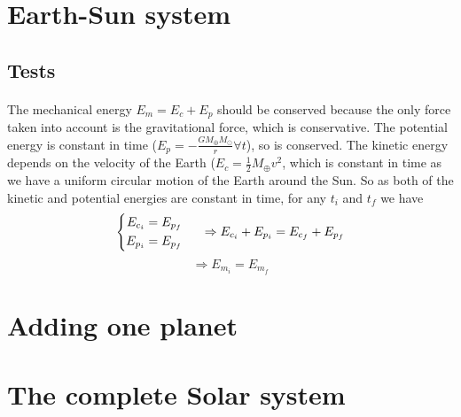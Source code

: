 \documentclass[a4paper, twoside, 11pt]{report}
\theoremstyle{theorem}
\theoremstyle{remark}
\theoremstyle{exemple}
\begin{document}
    \section{Earth-Sun system}
        \subsection{}
        
        \subsection{Tests}
            \paragraph{}The mechanical energy $E_m = E_c + E_p$ should be conserved because the only force taken into account is the gravitational force, which is conservative. The potential energy is constant in time ($E_p = -\frac{GM_{\oplus}M_{\odot}}{r} \forall t$), so is conserved. The kinetic energy depends on the velocity of the Earth ($E_c = \frac{1}{2}M_{\oplus}v^2$, which is constant in time as we have a uniform circular motion of the Earth around the Sun. So as both of the kinetic and potential energies are constant in time, for any $t_i$ and $t_f$ we have
                \begin{equation*}
                    \left\{
                        \begin{aligned}
                            E_{c_i} &= E_{p_f}\\
                            E_{p_i} &= E_{p_f}
                        \end{aligned}
                    \right. \hspace{0.5cm} \Rightarrow E_{c_i} + E_{p_i} = E_{c_f} + E_{p_f}
                \end{equation*} 
                \begin{equation*}
                    \Rightarrow E_{m_i} = E_{m_f}
                \end{equation*}
                        
    
    \section{Adding one planet}
    
    
    \section{The complete Solar system}
    
\end{document}

